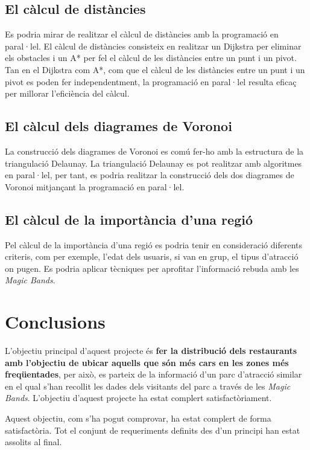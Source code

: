 \documentclass[12pt]{article}
\begin{document}
\subsection{El càlcul de distàncies}
Es podria mirar de realitzar el càlcul de distàncies amb la programació en paral·lel. El càlcul de distàncies consisteix en realitzar un Dijkstra per eliminar els obstacles i un A* per fel el càlcul de les distàncies entre un punt i un pivot. Tan en el Dijkstra com A*, com que el càlcul de les distàncies entre un punt i un pivot es poden fer independentment, la programació en paral·lel resulta eficaç per millorar l'eficiència del càlcul.

\subsection{El càlcul dels diagrames de Voronoi}
La construcció dels diagrames de Voronoi es comú fer-ho amb la estructura de la triangulació Delaunay. La triangulació Delaunay es pot realitzar amb algoritmes en paral·lel, per tant, es podria realitzar la construcció dels dos diagrames de Voronoi mitjançant la programació en paral·lel.

\subsection{El càlcul de la importància d'una regió}
Pel càlcul de la importància d'una regió es podria tenir en consideració diferents criteris, com per exemple, l'edat dels usuaris, si van en grup, el tipus d'atracció on pugen. Es podria aplicar tècniques per aprofitar l'informació rebuda amb les \textit{Magic Bands}.

\clearpage
\section{Conclusions}

L'objectiu principal d'aquest projecte és \textbf{fer la distribució dels restaurants amb l'objectiu de ubicar aquells que són més cars en les zones més freqüentades}, per això, es parteix de la informació d'un parc d'atracció similar en el qual s'han recollit les dades dels visitants del parc a través de les \textit{Magic Bands}. L'objectiu d'aquest projecte ha estat complert satisfactòriament. 

Aquest objectiu, com s’ha pogut comprovar, ha estat complert de forma satisfactòria. Tot el conjunt de requeriments definits des d’un principi han estat assolits al final.
\end{document}
